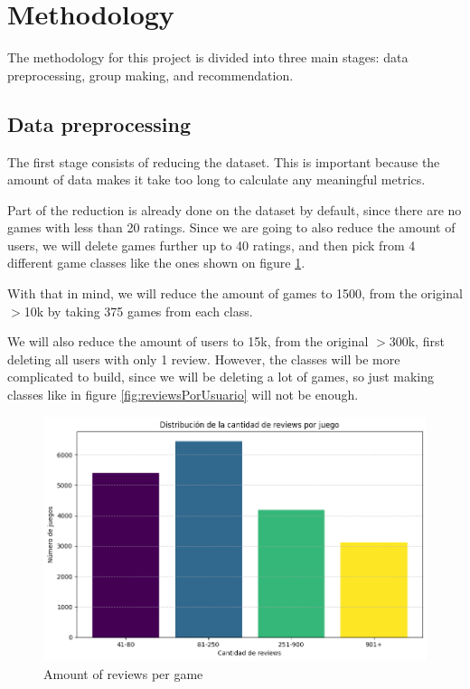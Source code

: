 \documentclass{article}
\begin{document}
\section{Methodology}

The methodology for this project is divided into three main stages: data preprocessing, group making, and recommendation.

\subsection{Data preprocessing}
The first stage consists of reducing the dataset. This is important because the amount of data makes it take too long to calculate any meaningful metrics.

Part of the reduction is already done on the dataset by default, since there are no games with less than 20 ratings. Since we are going to also reduce the amount of users, we will delete games further up to 40 ratings, and then pick from 4 different game classes like the ones shown on figure \ref{fig:reviewsPorJuego}.

With that in mind, we will reduce the amount of games to 1500, from the original $>$10k by taking 375 games from each class.

We will also reduce the amount of users to 15k, from the original $>$300k, first deleting all users with only 1 review. However, the classes will be more complicated to build, since we will be deleting a lot of games, so just making classes like in figure \ref{fig:reviewsPorUsuario} will not be enough.

\begin{figure}[h]
    \centering
    \includegraphics[width=0.8\linewidth]{ReviewsPorJuego.png}
    \caption{Amount of reviews per game}
    \label{fig:reviewsPorJuego}
\end{figure}
\end{document}
